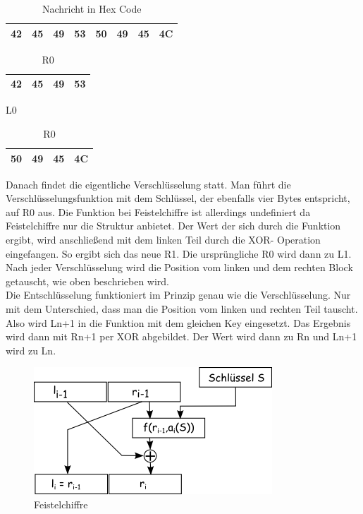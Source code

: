 \documentclass[course=asp]{aspdoc}
\begin{document}
\begin{table}[H]
\centering
    \begin{tabular}{|l|l|l|l|l|l|l|l|}
        \hline
        42 & 45 & 49 & 53 & 50 & 49 & 45 & 4C   \\
        \hline
    \end{tabular}
    \caption{Nachricht in Hex Code}
\end{table}



\begin{table}[H]

    \begin{minipage}{.5\linewidth}

      \centering
        \begin{tabular}{|l|l|l|l|}
		\hline
            42 & 45 & 49 & 53   \\
		\hline
        \end{tabular}

	\caption{L0}
    \end{minipage}%
    \begin{minipage}{.5\linewidth}

 \centering

        \begin{tabular}{|l|l|l|l|}
           \hline
		 50 & 49 & 45 & 4C   \\
		\hline
        \end{tabular}
\caption{R0}
    \end{minipage}
\end{table}
Danach findet die eigentliche Verschlüsselung statt. Man führt die Verschlüsselungsfunktion mit dem Schlüssel, der ebenfalls vier Bytes entspricht, auf R0 aus. Die Funktion bei Feistelchiffre ist allerdings undefiniert da Feistelchiffre nur die Struktur anbietet. Der Wert der sich durch die Funktion ergibt, wird anschließend mit dem linken Teil durch die XOR- Operation eingefangen. So ergibt sich das neue R1. Die ursprüngliche R0 wird dann zu L1. Nach jeder Verschlüsselung wird die Position vom linken und dem rechten Block getauscht, wie oben beschrieben wird.\\
Die Entschlüsselung funktioniert im Prinzip genau wie die Verschlüsselung. Nur mit dem Unterschied, dass man die Position vom linken und rechten Teil tauscht. Also wird Ln+1 in die Funktion mit dem gleichen Key eingesetzt. Das Ergebnis wird dann mit Rn+1 per XOR abgebildet. Der Wert wird dann zu Rn und Ln+1 wird zu Ln.~\cite{feistelchipher}

\begin{figure}[h]
\centering
\includegraphics[scale = 0.4]{feistel.png}
\caption{Feistelchiffre}
\end{figure}
\newpage
\end{document}
